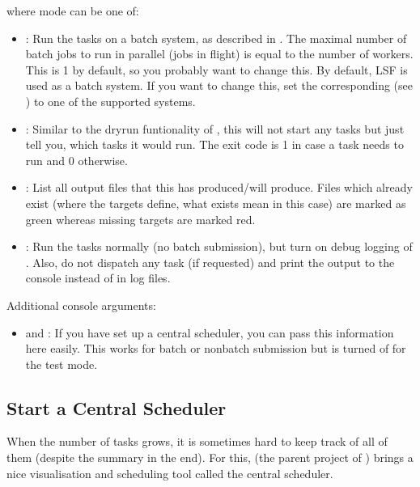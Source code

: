 \documentclass[letterpaper,10pt,english]{sphinxmanual}
\begin{document}
where mode can be one of:
\begin{itemize}
\item {} 
: Run the tasks on a batch system, as described in {\hyperref[\detokenize{usage/quickstart:quick-start-label}]{}}. The maximal number of
batch jobs to run in parallel (jobs in flight) is equal to the number of workers.
This is 1 by default, so you probably want to change this.
By default, LSF is used as a batch system. If you want to change this, set the corresponding 
(see {\hyperref[\detokenize{usage/batch:batch-label}]{}}) to one of the supported systems.

\item {} 
: Similar to the dry\sphinxhyphen{}run funtionality of , this will not start any tasks but just tell
you, which tasks it would run. The exit code is 1 in case a task needs to run and 0 otherwise.

\item {} 
: List all output files that this has produced/will produce. Files which already exist
(where the targets define, what exists mean in this case) are marked as green whereas missing targets are
marked red.

\item {} 
: Run the tasks normally (no batch submission), but turn on debug logging of . Also,
do not dispatch any task (if requested) and print the output to the console instead of in log files.

\end{itemize}

Additional console arguments:
\begin{itemize}
\item {} 
 and : If you have set up a central scheduler, you can pass this information
here easily. This works for batch or non\sphinxhyphen{}batch submission but is turned of for the test mode.

\end{itemize}


\subsection{Start a Central Scheduler}
\label{\detokenize{documentation/run_modes:start-a-central-scheduler}}
When the number of tasks grows, it is sometimes hard to keep track of all of them (despite the summary in the end).
For this,  (the parent project of ) brings a nice visualisation and scheduling tool called the central scheduler.
\end{document}
